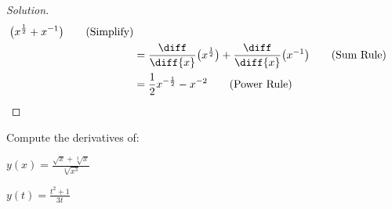 \documentclass[crop=false,class=article,oneside]{standalone}
\begin{document}
\begin{proof}[Solution]
\begin{minipage}[b]{.49\textwidth}
\begin{align*}
                            \big(x^{\frac{1}{2}}+x^{-1}\big)
                            \tag{Simplify}\\
                        &=\frac{\diff}{\diff{x}}
                            \big(x^{\frac{1}{2}}\big)
                            +\frac{\diff}{\diff{x}}
                            \big(x^{-1}\big)
                            \tag{Sum Rule}\\
                        &=\frac{1}{2}x^{-\frac{1}{2}}-x^{-2}
                            \vphantom{\frac{\diff}{\diff}}
                            \tag{Power Rule}
                    \end{align*}
                \end{minipage}
            \end{proof}
            \begin{problem}
                Compute the derivatives of:
                \begin{enumerate}[label=(\alph*)]
                    \begin{multicols}{2}
                        \item $y(x)=\frac{\sqrt{x}+\sqrt[3]{x}}%
                                         {\sqrt[4]{x^{3}}}$
                        \item $y(t)=\frac{t^{2}+1}{3t}$
                    \end{multicols}
                \end{enumerate}
            \end{problem}
\end{document}
